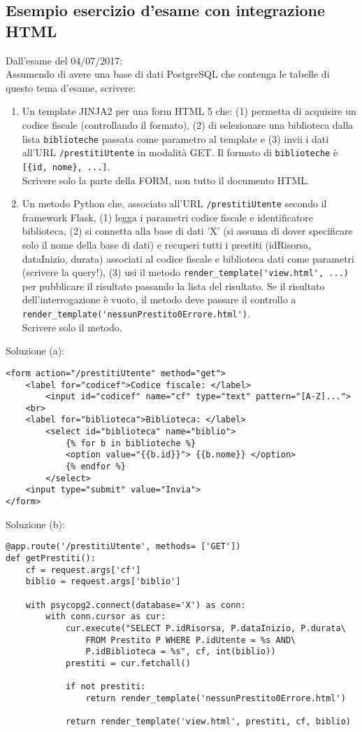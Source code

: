 \documentclass[a4paper, 10pt]{article}
\begin{document}
		\subsection{Esempio esercizio d'esame con integrazione HTML}
			Dall'esame del 04/07/2017:\\		
			Assumendo di avere una base di dati PostgreSQL che contenga le tabelle di questo tema d'esame, scrivere:
			\begin{enumerate}[label=(\alph*)]
				\item Un template JINJA2 per una form HTML 5 che: (1) permetta di acquisire un codice fiscale (controllando il formato), (2) di selezionare una biblioteca dalla lista \lstinline|biblioteche| passata come parametro al template e (3) invii i dati all'URL \lstinline|/prestitiUtente| in modalità GET. Il formato di \lstinline|biblioteche| è \lstinline|[{id, nome}, ...]|.\\
				Scrivere solo la parte della FORM, non tutto il documento HTML. 
				
				\item Un metodo Python che, associato all'URL \lstinline|/prestitiUtente| secondo il framework Flask, (1) legga i parametri codice fiscale e identificatore biblioteca, (2) si connetta alla base di dati 'X' (si assuma di dover specificare solo il nome della base di dati) e recuperi tutti i prestiti (idRisorsa, dataInizio, durata) associati al codice fiscale e biblioteca dati come parametri (scrivere la query!), (3) usi il metodo \lstinline|render_template('view.html', ...)| per pubblicare il risultato passando la lista del risultato. Se il  risultato dell'interrogazione è vuoto, il metodo deve passare il controllo a \lstinline|render_template('nessunPrestito0Errore.html')|.\\
				Scrivere solo il metodo.
			\end{enumerate}
			Soluzione (a):
			\lstset{language=HTML}
			\begin{lstlisting}[frame=tb, tabsize=2]
<form action="/prestitiUtente" method="get">
	<label for="codicef">Codice fiscale: </label>
		<input id="codicef" name="cf" type="text" pattern="[A-Z]...">
	<br>
	<label for="biblioteca">Biblioteca: </label>
		<select id="biblioteca" name="biblio">
			{% for b in biblioteche %}
			<option value="{{b.id}}"> {{b.nome}} </option>
			{% endfor %}
		</select>
	<input type="submit" value="Invia">
</form>
			\end{lstlisting}
			Soluzione (b):
			\lstset{language=Python}
			\begin{lstlisting}[frame=tb, tabsize=2]
@app.route('/prestitiUtente', methods= ['GET'])
def getPrestiti():
	cf = request.args['cf']
	biblio = request.args['biblio']
	
	with psycopg2.connect(database='X') as conn:
		with conn.cursor as cur:
			cur.execute("SELECT P.idRisorsa, P.dataInizio, P.durata\
				FROM Prestito P WHERE P.idUtente = %s AND\
				P.idBiblioteca = %s", cf, int(biblio))
			prestiti = cur.fetchall()
			
			if not prestiti:
				return render_template('nessunPrestito0Errore.html')
				
			return render_template('view.html', prestiti, cf, biblio)
			\end{lstlisting}
			
\end{document}
